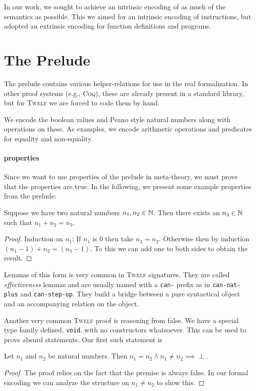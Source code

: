 \documentclass[a4paper, oneside, 10pt, draft]{memoir}
\newcommand{\twelf}{\textsc{Twelf}}
\newcommand{\coq}{\textsc{Coq}}
\newcommand{\bottom}{\perp}
\begin{document}
In our work, we sought to achieve an intrinsic encoding of as much of
the semantics as possible. This we aimed for an intrinsic encoding of
instructions, but adopted an extrinsic encoding for function
definitions and programs.

\section{The Prelude}

The prelude contains various helper-relations for use in the real
formalization. In other proof systems (e.g., \coq{}\cite{team:coq*1}),
these are already present in a standard library, but for \twelf{} we
are forced to code them by hand.

We encode the boolean values and Peano style natural numbers along with
operations on these. As examples, we encode arithmetic operations and
predicates for equality and non-equality.

\paragraph{properties}

Since we want to use properties of the prelude in meta-theory, we must
prove that the properties are true. In the following, we present some
example properties from the prelude:
\begin{lem}
  Suppose we have two natural numbers $n_1, n_2 \in \mathbb{N}$. Then there
  exists an $n_3 \in \mathbb{N}$ such that $n_1 + n_2 = n_3$.
\end{lem}
\begin{proof}
  Induction on $n_1$: If $n_1$ is $0$ then take $n_3 =
  n_2$. Otherwise then by induction $(n_1 - 1) + n_2 = (n_3 - 1)$. To this
  we can add one to both sides to obtain the result.
\end{proof}

Lemmas of this form is very common in \twelf{} signatures. They are
called \emph{effectiveness} lemmas and are usually named with a
\texttt{can-} prefix as in \texttt{can-nat-plus} and
\texttt{can-step-op}. They build a bridge between a pure syntactical
object and an accompanying relation on the object.

Another very common \twelf{} proof is reasoning from false. We have a
special type family defined, \texttt{void}, with no constructors
whatsoever. This can be used to prove absurd statements. Our first
such statement is
\begin{lem}
  Let $n_1$ and $n_2$ be natural numbers. Then $n_1 = n_2 \land n_1
  \neq n_2 \implies \bottom$.
\end{lem}
\begin{proof}
  The proof relies on the fact that the premise is always false. In
  our formal encoding we can analyze the structure on $n_1
  \neq n_2$ to show this.
\end{proof}
\end{document}
